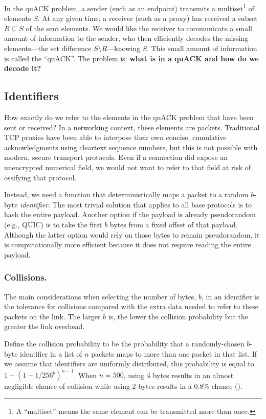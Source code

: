In the quACK problem, a sender (such as an endpoint) transmits a
multiset\footnote{A ``multiset'' means the same element can be transmitted more
than once.} of elements $S$. At any given time, a receiver (such as a proxy)
has received a subset $R \subseteq S$ of the sent elements. We would like the
receiver to communicate a small amount of information to the sender, who then
efficiently decodes the missing elements---the set difference $S \setminus
R$---knowing $S$. This small amount of information is called the ``quACK''. The
problem is: \textbf{what is in a quACK and how do we decode it?}

\subsection{Identifiers}
\label{sec:quack:problem:identifiers}

How exactly do we refer to the elements in the quACK problem that have been sent
or received? In a networking context, these elements are packets. Traditional
TCP proxies have been able to interpose their own concise, cumulative
acknowledgments using cleartext sequence numbers, but this is not possible with
modern, secure transport protocols. Even if a connection did expose an
unencrypted numerical field, we would not want to refer to that field at risk
of ossifying that protocol.

Instead, we need a function that deterministically maps
a packet to a random $b$-byte \emph{identifier}. The most trivial solution
that applies to all base protocols is
to hash the entire payload. Another option if the payload is already
pseudorandom (e.g., QUIC) is to take the first $b$ bytes from a fixed
offset of that payload. Although the latter option would rely on those bytes
to remain pseudorandom, it is computationally more efficient because it
does not require reading the entire payload.

\subsubsection{Collisions.}
The main considerations when selecting the number of bytes, $b$, in an
identifier is the tolerance for collisions compared with the extra data
needed to refer to these packets on the link. The larger $b$ is, the lower
the collision probability but the greater the link overhead.

Define the collision probability to be the probability that a randomly-chosen
$b$-byte identifier in a list of $n$ packets maps to more than one packet in
that list.
If we assume that identifiers are uniformly distributed,
this probability is equal to $1-(1 - 1/256^{b})^{n-1}$.
When $n=500$, using $4$ bytes results in an almost negligible
chance of collision while using $2$ bytes results in a 0.8\% chance
().

